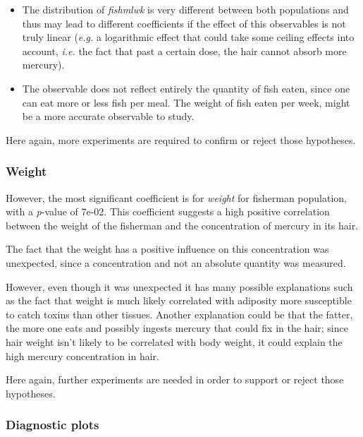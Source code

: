 \documentclass[12pt,]{article}
\begin{document}
\begin{itemize}
\item
  The distribution of \emph{fishmlwk} is very different between both
  populations and thus may lead to different coefficients if the effect
  of this observables is not truly linear (\emph{e.g.} a logarithmic
  effect that could take some ceiling effects into account, \emph{i.e.}
  the fact that past a certain dose, the hair cannot absorb more
  mercury).
\item
  The observable does not reflect entirely the quantity of fish eaten,
  since one can eat more or less fish per meal. The weight of fish eaten
  per week, might be a more accurate observable to study.
\end{itemize}

Here again, more experiments are required to confirm or reject those
hypotheses.

\subsubsection{Weight}\label{weight}

However, the most significant coefficient is for \emph{weight} for
fisherman population, with a \emph{p}-value of 7e-02. This coefficient
suggests a high positive correlation between the weight of the fisherman
and the concentration of mercury in its hair.

The fact that the weight has a positive influence on this concentration
was unexpected, since a concentration and not an absolute quantity was
measured.

However, even though it was unexpected it has many possible explanations
such as the fact that weight is much likely correlated with adiposity
more susceptible to catch toxins than other tissues. Another explanation
could be that the fatter, the more one eats and possibly ingests mercury
that could fix in the hair; since hair weight isn't likely to be
correlated with body weight, it could explain the high mercury
concentration in hair.

Here again, further experiments are needed in order to support or reject
those hypotheses.

\subsubsection{Diagnostic plots}\label{diagnostic-plots}
\end{document}
